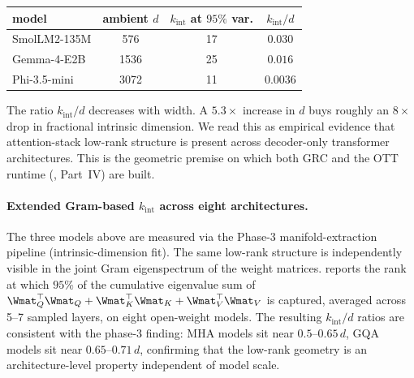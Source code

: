 \documentclass[11pt]{article}
\begin{document}
\begin{center}\small
\begin{tabular}{lccc}\toprule
model & ambient $d$ & $k_{\mathrm{int}}$ at $95\%$ var. & $k_{\mathrm{int}}/d$\\\midrule
SmolLM2-135M   & 576  & 17 & $0.030$\\
Gemma-4-E2B    & 1536 & 25 & $0.016$\\
Phi-3.5-mini   & 3072 & 11 & $0.0036$\\\bottomrule
\end{tabular}\end{center}

The ratio $k_{\mathrm{int}}/d$ decreases with width. A $5.3\times$ increase
in $d$ buys roughly an $8\times$ drop in fractional intrinsic dimension. We
read this as empirical evidence that attention-stack low-rank structure is
present across decoder-only transformer architectures. This is the geometric
premise on which both GRC and the OTT runtime (,
Part~IV) are built.

\paragraph{Extended Gram-based $k_{\mathrm{int}}$ across eight architectures.}
The three models above are measured via the Phase-3 manifold-extraction
pipeline (intrinsic-dimension fit).  The same low-rank structure is
independently visible in the joint Gram eigenspectrum of the weight
matrices.   reports the rank at which
$95\%$ of the cumulative eigenvalue sum of
$\Wmat_Q^\top\Wmat_Q+\Wmat_K^\top\Wmat_K+\Wmat_V^\top\Wmat_V$
is captured, averaged across 5--7 sampled layers, on eight
open-weight models.  The resulting $k_{\mathrm{int}}/d$ ratios are
consistent with the phase-3 finding: MHA models sit near $0.5$--$0.65\,d$,
GQA models sit near $0.65$--$0.71\,d$, confirming that the low-rank
geometry is an architecture-level property independent of model scale.
\end{document}
